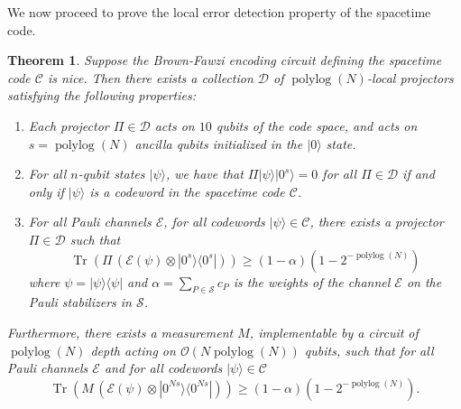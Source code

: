 \documentclass[11pt,letterpaper]{article}
\newtheorem{theorem}{Theorem}[section]
\theoremstyle{definition}
\theoremstyle{remark}
\newcommand{\Paren}[1]{\left(#1\right)}
\DeclareMathOperator{\Tr}{Tr}
\DeclareMathOperator{\polylog}{polylog}
\newcommand{\cC}{\mathcal C}
\newcommand{\cD}{\mathcal D}
\newcommand{\cE}{\mathcal E}
\newcommand{\cS}{\mathcal S}
\renewcommand{\geq}{\geqslant}
\numberwithin{equation}{section}
\theoremstyle{definition}
\newcommand{\ket}[1]{|#1\rangle}
\newcommand{\ketbra}[2]{|#1\rangle\! \langle #2|}
\begin{document}
We now proceed to prove the local error detection property of the spacetime code.

\begin{theorem}
\label{thm:local_detection}
  Suppose the Brown-Fawzi encoding circuit defining the spacetime code $\cC$ is nice. Then there exists a collection $\cD$ of $\polylog(N)$-local projectors satisfying the following properties:
  \begin{enumerate}
    \item Each projector $\Pi \in \cD$ acts on $10$ qubits of the code space, and acts on $s = \polylog(N)$ ancilla qubits initialized in the $\ket{0}$ state. 
    \item For all $n$-qubit states $\ket{\psi}$, we have that $\Pi \ket{\psi} \ket{0^s} = 0$ for all $\Pi \in \cD$ if and only if $\ket{\psi}$ is a codeword in the spacetime code $\cC$.
    \item For all Pauli channels $\cE$, for all codewords $\ket{\psi} \in \cC$, there exists a projector $\Pi \in \cD$ such that
    \begin{equation}
      \Tr \Paren{\Pi \, \Paren{\cE(\psi) \otimes \ketbra{0^s}{0^s}} } \geq (1 - \alpha)(1 - 2^{-\polylog(N)})
    \end{equation}
    where $\psi = \ketbra{\psi}{\psi}$ and $\alpha = \sum_{P \in \cS} c_P$ is the weights of the channel $\cE$ on the Pauli stabilizers in $\cS$. %
    \end{enumerate}
    Furthermore, there exists a measurement $M$, implementable by a circuit of $\polylog(N)$ depth acting on $\mathcal{O}(N \polylog(N))$ qubits, such that for all Pauli channels $\cE$ and for all codewords $\ket{\psi} \in \cC$
    \begin{equation}
      \Tr \Paren{ M \, \Paren{ \cE(\psi) \otimes \ketbra{0^{Ns}}{0^{Ns}} }} \geq (1 - \alpha) (1 - 2^{-\polylog(N)}).
    \end{equation}
\end{theorem}
\end{document}
